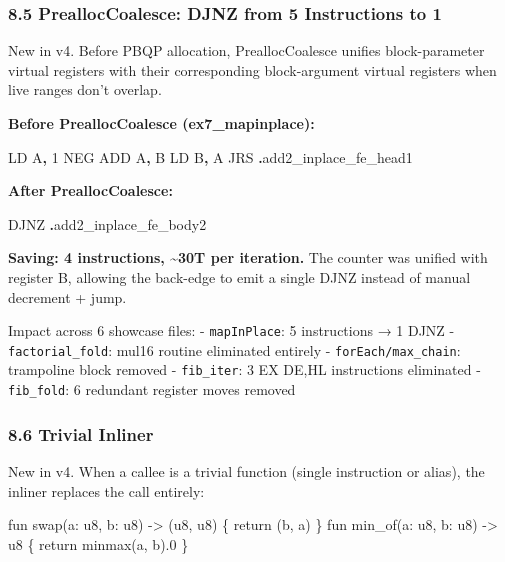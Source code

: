 \documentclass[
  11pt,
  a4paper,
]{report}
\newenvironment{Shaded}{\begin{snugshade}\small}{\end{snugshade}}
\newcommand{\BuiltInTok}[1]{#1}
\newcommand{\DecValTok}[1]{\textcolor[rgb]{0.00,0.00,0.81}{#1}}
\newcommand{\NormalTok}[1]{#1}
\newcommand{\OperatorTok}[1]{\textcolor[rgb]{0.81,0.36,0.00}{\textbf{#1}}}
\begin{document}
\subsubsection{8.5 PreallocCoalesce: DJNZ from 5 Instructions to
1}\label{prealloccoalesce-djnz-from-5-instructions-to-1}

New in v4. Before PBQP allocation, PreallocCoalesce unifies
block-parameter virtual registers with their corresponding
block-argument virtual registers when live ranges don't overlap.

\textbf{Before PreallocCoalesce (ex7\_mapinplace):}

\begin{Shaded}
\begin{Highlighting}[]
\NormalTok{    LD A}\OperatorTok{,} \DecValTok{1}
    \BuiltInTok{NEG}
    \BuiltInTok{ADD}\NormalTok{ A}\OperatorTok{,}\NormalTok{ B}
\NormalTok{    LD B}\OperatorTok{,}\NormalTok{ A}
\NormalTok{    JRS }\OperatorTok{.}\NormalTok{add2\_inplace\_fe\_head1}
\end{Highlighting}
\end{Shaded}

\textbf{After PreallocCoalesce:}

\begin{Shaded}
\begin{Highlighting}[]
\NormalTok{    DJNZ }\OperatorTok{.}\NormalTok{add2\_inplace\_fe\_body2}
\end{Highlighting}
\end{Shaded}

\textbf{Saving: 4 instructions, \textasciitilde30T per iteration.} The
counter was unified with register B, allowing the back-edge to emit a
single DJNZ instead of manual decrement + jump.

Impact across 6 showcase files: - \texttt{mapInPlace}: 5 instructions →
1 DJNZ - \texttt{factorial\_fold}: mul16 routine eliminated entirely -
\texttt{forEach/max\_chain}: trampoline block removed -
\texttt{fib\_iter}: 3 EX DE,HL instructions eliminated -
\texttt{fib\_fold}: 6 redundant register moves removed

\subsubsection{8.6 Trivial Inliner}\label{trivial-inliner}

New in v4. When a callee is a trivial function (single instruction or
alias), the inliner replaces the call entirely:

\begin{Shaded}
\begin{Highlighting}[]
\NormalTok{fun swap(a: u8, b: u8) {-}\textgreater{} (u8, u8) \{ return (b, a) \}}
\NormalTok{fun min\_of(a: u8, b: u8) {-}\textgreater{} u8 \{ return minmax(a, b).0 \}}
\end{Highlighting}
\end{Shaded}
\end{document}
